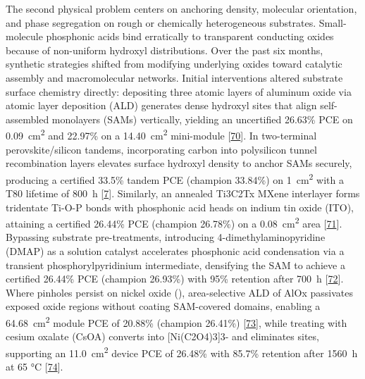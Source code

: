\documentclass[
  11pt,
]{article}
\begin{document}
The second physical problem centers on anchoring density, molecular
orientation, and phase segregation on rough or chemically heterogeneous
substrates. Small-molecule phosphonic acids bind erratically to
transparent conducting oxides because of non-uniform hydroxyl
distributions. Over the past six months, synthetic strategies shifted
from modifying underlying oxides toward catalytic assembly and
macromolecular networks. Initial interventions altered substrate surface
chemistry directly: depositing three atomic layers of aluminum oxide via
atomic layer deposition (ALD) generates dense hydroxyl sites that align
self-assembled monolayers (SAMs) vertically, yielding an uncertified
26.63\% PCE on \qty{0.09}{\centi\meter\squared} and 22.97\% on a
\qty{14.40}{\centi\meter\squared} mini-module
{[}\href{https://doi.org/10.1021/acsami.6c03372}{70}{]}. In two-terminal
perovskite/silicon tandems, incorporating carbon into polysilicon tunnel
recombination layers elevates surface hydroxyl density to anchor SAMs
securely, producing a certified 33.5\% tandem PCE (champion 33.84\%) on
\qty{1}{\centi\meter\squared} with a T80 lifetime of \qty{800}{\hour}
{[}\href{https://doi.org/10.1038/s41467-026-72794-x}{7}{]}. Similarly,
an annealed Ti3C2Tx MXene interlayer forms tridentate Ti-O-P bonds with
phosphonic acid heads on indium tin oxide (ITO), attaining a certified
26.44\% PCE (champion 26.78\%) on a \qty{0.08}{\centi\meter\squared}
area {[}\href{https://doi.org/10.1002/aenm.70966}{71}{]}. Bypassing
substrate pre-treatments, introducing 4-dimethylaminopyridine (DMAP) as
a solution catalyst accelerates phosphonic acid condensation via a
transient phosphorylpyridinium intermediate, densifying the SAM to
achieve a certified 26.44\% PCE (champion 26.93\%) with 95\% retention
after \qty{700}{\hour}
{[}\href{https://doi.org/10.1021/acsenergylett.6c01257}{72}{]}. Where
pinholes persist on nickel oxide (), area-selective ALD of
AlOx passivates exposed oxide regions without coating SAM-covered
domains, enabling a \qty{64.68}{\centi\meter\squared} module PCE of
20.88\% (champion 26.41\%)
{[}\href{https://doi.org/10.1002/anie.202516537}{73}{]}, while treating
 with cesium oxalate (CsOA) converts  into
{[}Ni(C2O4)3{]}3- and eliminates  sites, supporting an
\qty{11.0}{\centi\meter\squared} device PCE of 26.48\% with 85.7\%
retention after \qty{1560}{\hour} at 65 °C
{[}\href{https://doi.org/10.1002/anie.4012708}{74}{]}.
\end{document}
